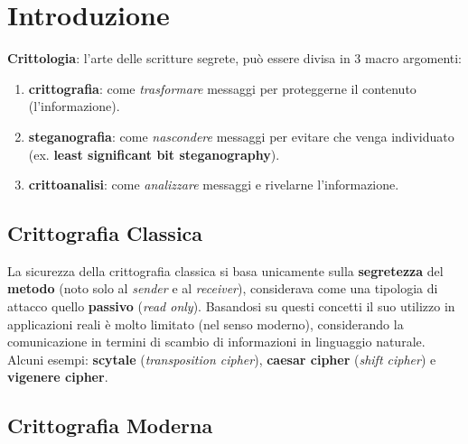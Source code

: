 \chapter{Introduzione}
\textbf{Crittologia}: l'arte delle scritture segrete, può essere divisa in 3 macro argomenti:
\begin{enumerate}[nosep]
    \item \textbf{crittografia}: come \textit{trasformare} messaggi per proteggerne il contenuto (l'informazione).
    \item \textbf{steganografia}: come \textit{nascondere} messaggi per evitare che venga individuato (ex. \textbf{least significant bit steganography}).
    \item \textbf{crittoanalisi}: come \textit{analizzare} messaggi e rivelarne l'informazione.   
\end{enumerate}

\section{Crittografia Classica}
La sicurezza della crittografia classica si basa unicamente sulla \textbf{segretezza} del \textbf{metodo} (noto solo al \textit{sender} e al \textit{receiver}), considerava come una tipologia di attacco quello \textbf{passivo} (\textit{read only}). Basandosi su questi concetti il suo utilizzo in applicazioni reali è molto limitato (nel senso moderno), considerando la comunicazione in termini di scambio di informazioni in linguaggio naturale. \\
Alcuni esempi: \textbf{scytale} (\textit{transposition cipher}), \textbf{caesar cipher} (\textit{shift cipher}) e \textbf{vigenere cipher}.

\newpage
\section{Crittografia Moderna}
